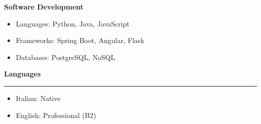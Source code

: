 \documentclass[9pt, a4paper]{article}
\newcommand{\cvsection}[1]{%
	\vspace{4pt}\par
	{\Large\bfseries\color{sectionblue}#1}\par
	\vspace{2pt}\hrule\vspace{6pt}
}
\begin{document}
\begin{minipage}[t]{0.27\linewidth}
		{\bfseries Software Development}
		\begin{itemize}[leftmargin=*, nosep, itemsep=2pt]
			\item Languages: Python, Java, JavaScript
			\item Frameworks: Spring Boot, Angular, Flask
			\item Databases: PostgreSQL, NoSQL
		\end{itemize}
		
		
		\cvsection{Languages}
		\begin{itemize}[leftmargin=*, nosep, itemsep=2pt]
			\item Italian: Native
			\item English: Professional (B2)
		\end{itemize}
		
	\end{minipage}
	
\end{document}
